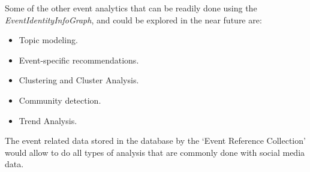 Some of the other event analytics that can be readily done using the \textit{EventIdentityInfoGraph}, and could be explored in the near future are:
\begin{itemize}
\item Topic modeling.
\item Event-specific recommendations.
\item Clustering and Cluster Analysis.
\item Community detection.
\item Trend Analysis.
\end{itemize}

The event related data stored in the database by the `Event Reference Collection' would allow to do all types of analysis that are commonly done with social media data.

